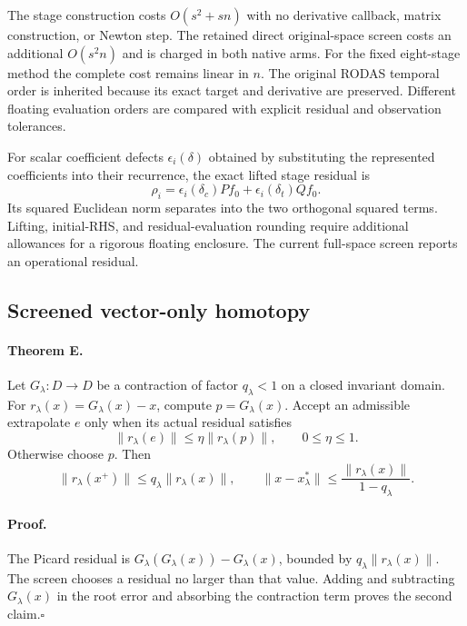 The stage construction costs $O(s^2+sn)$ with no derivative callback,
matrix construction, or Newton step. The retained direct original-space
screen costs an additional $O(s^2n)$ and is charged in both native arms.
For the fixed eight-stage method the complete cost remains linear in $n$.
The original RODAS temporal order is inherited because its exact target and
derivative are preserved. Different floating evaluation orders are compared
with explicit residual and observation tolerances.

For scalar coefficient defects $\epsilon_i(\delta)$ obtained by substituting
the represented coefficients into their recurrence, the exact lifted
stage residual is
\begin{equation}
 \rho_i=\epsilon_i(\delta_c)P f_0+
         \epsilon_i(\delta_t)Q f_0.
\end{equation}
Its squared Euclidean norm separates into the two orthogonal squared terms.
Lifting, initial-RHS, and residual-evaluation rounding require additional
allowances for a rigorous floating enclosure. The current full-space
screen reports an operational residual.

\subsection{Screened vector-only homotopy}

\paragraph{Theorem E.}
Let $G_\lambda:D\to D$ be a contraction of factor $q_\lambda<1$ on a
closed invariant domain. For $r_\lambda(x)=G_\lambda(x)-x$, compute
$p=G_\lambda(x)$. Accept an admissible extrapolate $e$ only when its actual
residual satisfies
\begin{equation}
 \|r_\lambda(e)\|\le\eta\|r_\lambda(p)\|,
 \qquad 0\le\eta\le1.
\end{equation}
Otherwise choose $p$. Then
\begin{equation}
 \|r_\lambda(x^+)\|\le q_\lambda\|r_\lambda(x)\|,
 \qquad \|x-x_\lambda^*\|\le
 \frac{\|r_\lambda(x)\|}{1-q_\lambda}.
\end{equation}

\paragraph{Proof.}
The Picard residual is $G_\lambda(G_\lambda(x))-G_\lambda(x)$, bounded
by $q_\lambda\|r_\lambda(x)\|$. The screen chooses a residual no larger
than that value. Adding and subtracting $G_\lambda(x)$ in the root error
and absorbing the contraction term proves the second claim.\hfill$\square$

